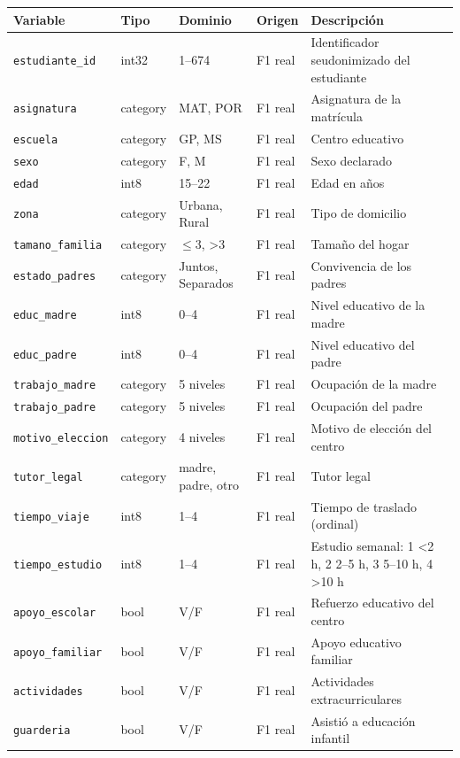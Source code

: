\begin{tabular}{p{3.9cm}p{1.2cm}p{2.2cm}p{1.9cm}p{5.6cm}}
\toprule
Variable & Tipo & Dominio & Origen & Descripción \\
\midrule
\texttt{estudiante\_id} & int32 & 1–674 & F1 real & Identificador seudonimizado del estudiante \\
\texttt{asignatura} & category & MAT, POR & F1 real & Asignatura de la matrícula \\
\texttt{escuela} & category & GP, MS & F1 real & Centro educativo \\
\texttt{sexo} & category & F, M & F1 real & Sexo declarado \\
\texttt{edad} & int8 & 15–22 & F1 real & Edad en años \\
\texttt{zona} & category & Urbana, Rural & F1 real & Tipo de domicilio \\
\texttt{tamano\_familia} & category & $\leq$3, >3 & F1 real & Tamaño del hogar \\
\texttt{estado\_padres} & category & Juntos, Separados & F1 real & Convivencia de los padres \\
\texttt{educ\_madre} & int8 & 0–4 & F1 real & Nivel educativo de la madre \\
\texttt{educ\_padre} & int8 & 0–4 & F1 real & Nivel educativo del padre \\
\texttt{trabajo\_madre} & category & 5 niveles & F1 real & Ocupación de la madre \\
\texttt{trabajo\_padre} & category & 5 niveles & F1 real & Ocupación del padre \\
\texttt{motivo\_eleccion} & category & 4 niveles & F1 real & Motivo de elección del centro \\
\texttt{tutor\_legal} & category & madre, padre, otro & F1 real & Tutor legal \\
\texttt{tiempo\_viaje} & int8 & 1–4 & F1 real & Tiempo de traslado (ordinal) \\
\texttt{tiempo\_estudio} & int8 & 1–4 & F1 real & Estudio semanal: 1 <2 h, 2 2–5 h, 3 5–10 h, 4 >10 h \\
\texttt{apoyo\_escolar} & bool & V/F & F1 real & Refuerzo educativo del centro \\
\texttt{apoyo\_familiar} & bool & V/F & F1 real & Apoyo educativo familiar \\
\texttt{actividades} & bool & V/F & F1 real & Actividades extracurriculares \\
\texttt{guarderia} & bool & V/F & F1 real & Asistió a educación infantil \\

\end{tabular}
